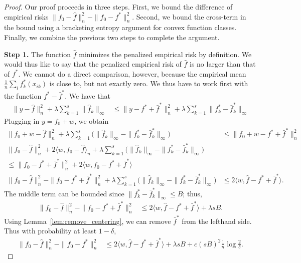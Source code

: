 \documentclass[12pt,pdftex,aos,noinfoline,addressasfootnote]{imsart}
\begin{document}
\begin{proof}
Our proof proceeds in three steps.  First, we bound
the difference of empirical risks $\|f_0 - \hat{f} \|_n^2 - \| f_0 -
f^* \|_n^2$.  Second, we bound the cross-term in the bound using
a bracketing entropy argument for convex function classes.  Finally, 
we combine the previous two steps to complete the argument.

\textbf{Step 1.} The function $\hat{f}$ minimizes the penalized
empirical risk by definition. We would thus like to say that the
penalized empirical risk of $\hat{f}$ is no larger than that of
$f^*$. We cannot do a direct comparison, however, because the empirical mean
$\frac{1}{n} \sum_i f^*_k(x_{ik})$ is close to, but not exactly
zero. We thus have to work first with the function $f^* - \bar{f}^*$.
We have that
\begin{align*}
\| y - \hat{f} \|_n^2 + \lambda \sum_{k=1}^s \| \hat{f}_k \|_\infty &\leq
  \| y - f^* + \bar{f}^* \|_n^2 + \lambda \sum_{k=1}^s \| f^*_k - \bar{f}^*_k \|_\infty 
\end{align*}
Plugging in $y = f_0 + w$, we obtain
\begin{align*}
\| f_0 + w - \hat{f} \|_n^2 + \lambda \sum_{k=1}^s \Big( \| \hat{f}_k \|_\infty - 
    \| f^*_k - \bar{f}^*_k \|_\infty \Big) &\leq \|f_0 + w - f^* + \bar{f}^* \|_n^2 \\
\| f_0 - \hat{f} \|_n^2 + 2\langle w, f_0 - \hat{f} \rangle_n 
     +\lambda \sum_{k=1}^s \Big( \| \hat{f}_k \|_\infty - \|f^*_k -\bar{f}^*_k\|_\infty \Big) 
    &\\
\leq \| f_0 - f^* + \bar{f}^* \|_n^2 + 
    2 \langle w, f_0 - f^* + \bar{f}^* \rangle \\
\|f_0 - \hat{f} \|_n^2 - \| f_0 - f^* + \bar{f}^* \|_n^2 + 
    \lambda \sum_{k=1}^s \Big( \| \hat{f}_k \|_\infty - 
 \| f^*_k - \bar{f}^*_k \|_\infty \Big) &\leq 2 \langle w, \hat{f} - f^* + \bar{f}^* \rangle.
\end{align*}
The middle term can be bounded since $\|f^*_k -
\bar{f}^*_k \|_\infty \leq B$; thus,
\begin{align*}
\|f_0 - \hat{f} \|_n^2 - \| f_0 - f^* + \bar{f}^* \|_n^2 
   &\leq 2 \langle w, \hat{f} - f^* + \bar{f}^* \rangle + \lambda s B .
\end{align*}
Using Lemma~\ref{lem:remove_centering}, we can remove $\bar{f}^*$ from
the lefthand side. Thus with probability at least $1 - \delta$,
\begin{align}
\label{eqn:first_step_inequality}
\|f_0 - \hat{f} \|_n^2 - \| f_0 - f^* \|_n^2 
   &\leq 2 \langle w, \hat{f} - f^* + \bar{f}^* \rangle + \lambda  s B + c(sB)^2 \frac{1}{n} \log \frac{2}{\delta}.
\end{align}


\end{proof}
\end{document}
